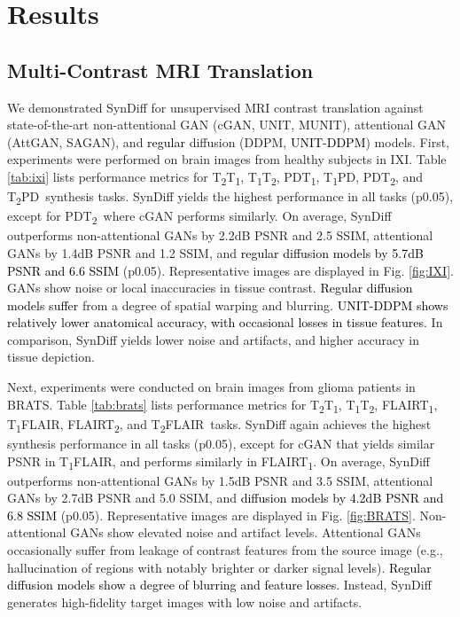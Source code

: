 \documentclass[journal,twoside,web]{ieeecolor}
\newcommand{\ToneTtwo}{T\textsubscript{1}T\textsubscript{2}}
\newcommand{\TonePD}{T\textsubscript{1}PD}
\newcommand{\TtwoTone}{T\textsubscript{2}T\textsubscript{1}}
\newcommand{\TtwoPD}{T\textsubscript{2}PD}
\newcommand{\PDTone}{PDT\textsubscript{1}}
\newcommand{\PDTtwo}{PDT\textsubscript{2}}
\newcommand{\TtwoFlair}{T\textsubscript{2}FLAIR}
\newcommand{\FlairTtwo}{FLAIRT\textsubscript{2}}
\newcommand{\ToneFlair}{T\textsubscript{1}FLAIR}
\newcommand{\FlairTone}{FLAIRT\textsubscript{1}}
\newcommand*{\revhl}{\textcolor{black}}
\begin{document}
\section{Results}
\subsection{Multi-Contrast MRI Translation}
We demonstrated SynDiff for unsupervised MRI contrast translation against state-of-the-art non-attentional GAN (cGAN, UNIT, MUNIT), attentional GAN (AttGAN, SAGAN), and \revhl{regular} diffusion (DDPM, \revhl{UNIT-DDPM}) models. First, experiments were performed on brain images from healthy subjects in IXI. Table \ref{tab:ixi} lists performance metrics for \TtwoTone, \ToneTtwo, \PDTone, \TonePD, \PDTtwo, and \TtwoPD~synthesis tasks. SynDiff yields the highest performance in all tasks (p0.05), except for \PDTtwo~where cGAN performs similarly. On average, SynDiff outperforms non-attentional GANs by 2.2dB PSNR and 2.5 SSIM, attentional GANs by 1.4dB PSNR and 1.2 SSIM, and \revhl{regular diffusion models by 5.7dB PSNR and 6.6 SSIM} (p0.05). Representative images are displayed in Fig. \ref{fig:IXI}. GANs show noise or local inaccuracies in tissue contrast. \revhl{Regular diffusion models suffer} from a degree of spatial warping and blurring. \revhl{UNIT-DDPM shows relatively lower anatomical accuracy, with occasional losses in tissue features.} In comparison, SynDiff yields lower noise and artifacts, and higher accuracy in tissue depiction. 

Next, experiments were conducted on brain images from glioma patients in BRATS. Table \ref{tab:brats} lists performance metrics for \TtwoTone, \ToneTtwo, \FlairTone, \ToneFlair, \FlairTtwo, and \TtwoFlair~tasks. SynDiff again achieves the highest synthesis performance in all tasks (p0.05), except for cGAN that yields similar PSNR in \ToneFlair, and performs similarly in \FlairTone. On average, SynDiff outperforms non-attentional GANs by 1.5dB PSNR and 3.5 SSIM, attentional GANs by 2.7dB PSNR and 5.0 SSIM, and \revhl{diffusion models by 4.2dB PSNR and 6.8 SSIM} (p0.05). Representative images are displayed in Fig. \ref{fig:BRATS}. Non-attentional GANs show elevated noise and artifact levels. Attentional GANs occasionally suffer from leakage of contrast features from the source image (e.g., hallucination of regions with notably brighter or darker signal levels). \revhl{Regular diffusion models show a degree of blurring and feature losses.} Instead, SynDiff generates high-fidelity target images with low noise and artifacts. 
\end{document}

